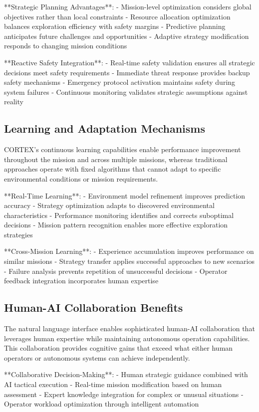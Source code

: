 **Strategic Planning Advantages**:
- Mission-level optimization considers global objectives rather than local constraints
- Resource allocation optimization balances exploration efficiency with safety margins
- Predictive planning anticipates future challenges and opportunities
- Adaptive strategy modification responds to changing mission conditions

**Reactive Safety Integration**:
- Real-time safety validation ensures all strategic decisions meet safety requirements
- Immediate threat response provides backup safety mechanisms
- Emergency protocol activation maintains safety during system failures
- Continuous monitoring validates strategic assumptions against reality

\subsection{Learning and Adaptation Mechanisms}

CORTEX's continuous learning capabilities enable performance improvement throughout the mission and across multiple missions, whereas traditional approaches operate with fixed algorithms that cannot adapt to specific environmental conditions or mission requirements.

**Real-Time Learning**:
- Environment model refinement improves prediction accuracy
- Strategy optimization adapts to discovered environmental characteristics
- Performance monitoring identifies and corrects suboptimal decisions
- Mission pattern recognition enables more effective exploration strategies

**Cross-Mission Learning**:
- Experience accumulation improves performance on similar missions
- Strategy transfer applies successful approaches to new scenarios
- Failure analysis prevents repetition of unsuccessful decisions
- Operator feedback integration incorporates human expertise

\subsection{Human-AI Collaboration Benefits}

The natural language interface enables sophisticated human-AI collaboration that leverages human expertise while maintaining autonomous operation capabilities. This collaboration provides cognitive gains that exceed what either human operators or autonomous systems can achieve independently.

**Collaborative Decision-Making**:
- Human strategic guidance combined with AI tactical execution
- Real-time mission modification based on human assessment
- Expert knowledge integration for complex or unusual situations
- Operator workload optimization through intelligent automation

